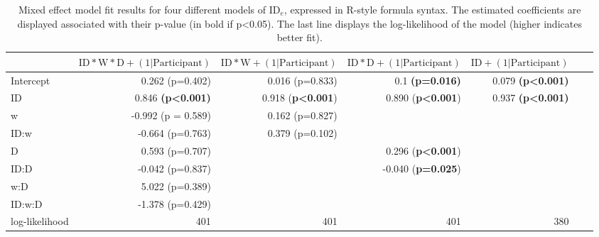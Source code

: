 \documentclass[acmlarge, manuscript,review]{acmart}
\newcommand{\ide}{\ensuremath{{\text{ID}_e}}\xspace}
\newcommand{\D}{\ensuremath{{\text{D}}}\xspace}
\newcommand{\W}{\ensuremath{{\text{W}}}\xspace}
\begin{document}
\begin{table}
  \caption{Mixed effect model fit results for four different models of \ide, expressed in R-style formula syntax. The estimated coefficients are displayed associated with their p-value (in bold if p<0.05). The last line displays the log-likelihood of the model (higher indicates better fit).}
  \label{tab:fit_jgp_ide_id}
  \begin{center}
    \begin{tabular}{lrrrrrr}
      \hline
      &  $\text{ID}*\W*\D + (1|\text{Participant})$ & $\text{ID}*\W + (1|\text{Participant})$ & $\text{ID}*\D + (1 | \text{Participant})$ & $\text{ID}+ (1 | \text{Participant})$  \\
      \hline
      Intercept &  0.262 (p=0.402) &            0.016 (p=0.833) &  0.1 \textbf{(p=0.016)} & 0.079 \textbf{(p\textless0.001)} \\
      ID        &  0.846 \textbf{(p\textless0.001)} &    0.918 (\textbf{p\textless0.001}) &  0.890 (\textbf{p\textless0.001}) & 0.937 \textbf{(p\textless0.001)}  \\
      w         & -0.992 (p = 0.589) & 0.162 (p=0.827)    &   & \\
      ID:w      & -0.664 (p=0.763) &    0.379 (p=0.102)  &   & \\
      D         &  0.593 (p=0.707) &    &  0.296 (\textbf{p\textless0.001})  & \\
      ID:D      & -0.042 (p=0.837) &     & -0.040 (\textbf{p=0.025})  & \\
      w:D       &  5.022 (p=0.389) &     &  &   \\
      ID:w:D    & -1.378 (p=0.429) &     &   & \\
      log-likelihood & 401 & 401 & 401  & 380\\
      \hline
    \end{tabular}
  \end{center}
\end{table}

\end{document}
